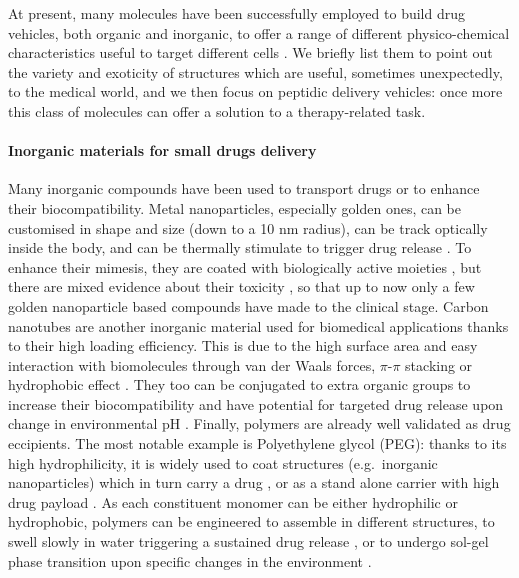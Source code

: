 At present, many molecules have been successfully employed to build drug vehicles, both organic and inorganic, to offer a range of different physico-chemical characteristics useful to target different cells \citep{Hughes2005}. We briefly list them to point out the variety and exoticity of structures which are useful, sometimes unexpectedly, to the medical world, and we then focus on peptidic delivery vehicles: once more this class of molecules can offer a solution to a therapy-related task.

\paragraph{Inorganic materials for small drugs delivery}


Many inorganic compounds have been used to transport drugs or to enhance their biocompatibility. Metal nanoparticles, especially golden ones, can be customised in shape and size (down to a 10 nm radius), can be track optically inside the body, and can be thermally stimulate to trigger drug release \citep{Boisselier2009}. To enhance their mimesis, they are coated with biologically active moieties \citep{Singh2018}, but there are mixed evidence about their toxicity \citep{Boisselier2009}, so that up to now only a few golden nanoparticle based compounds have made to the clinical stage.
%
Carbon nanotubes are another inorganic material used for biomedical applications thanks to their high loading efficiency. This is due to the high surface area and easy interaction with biomolecules through van der Waals forces, $\pi$-$\pi$ stacking or hydrophobic effect \citep{Erol2017}. They too can be conjugated to extra organic groups to increase their biocompatibility and have potential for targeted drug release upon change in environmental pH \citep{Depan2011}.
%
Finally, polymers are already well validated as drug eccipients. The most notable example is Polyethylene glycol (PEG): thanks to its high hydrophilicity, it is widely used to coat structures (e.g.\ inorganic nanoparticles) which in turn carry a drug \citep{Lammers2009}, or as a stand alone carrier with high drug payload \citep{Liechty2010}. As each constituent monomer can be either hydrophilic or hydrophobic, polymers can be engineered to assemble in different structures, to swell slowly in water triggering a sustained drug release \citep{Nicolas2013}, or to undergo sol-gel phase transition upon specific changes in the environment \citep{Liechty2010}.


